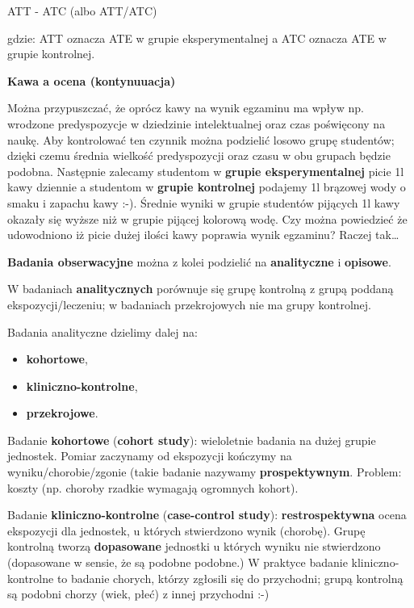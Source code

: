 \documentclass[
  openany]{book}
\begin{document}
ATT - ATC (albo ATT/ATC)

gdzie: ATT oznacza ATE w grupie eksperymentalnej
a ATC oznacza ATE w grupie kontrolnej.

\begin{example}
\textbf{Kawa a ocena (kontynuuacja)}

Można przypuszczać, że oprócz kawy na wynik egzaminu ma wpływ np. wrodzone predyspozycje
w dziedzinie intelektualnej oraz czas poświęcony na naukę.
Aby kontrolować ten czynnik można podzielić losowo grupę studentów;
dzięki czemu średnia wielkość predyspozycji oraz czasu w obu grupach będzie podobna.
Następnie zalecamy studentom w \textbf{grupie eksperymentalnej} picie 1l kawy dziennie
a studentom w \textbf{grupie kontrolnej} podajemy 1l brązowej wody o smaku i zapachu kawy :-).
Średnie wyniki w
grupie studentów pijących 1l kawy okazały się wyższe niż w grupie pijącej kolorową wodę.
Czy można powiedzieć że udowodniono
iż picie dużej ilości kawy poprawia wynik egzaminu?
Raczej tak\ldots{}
\end{example}

\textbf{Badania obserwacyjne} można z kolei podzielić na \textbf{analityczne} i \textbf{opisowe}.

W badaniach \textbf{analitycznych} porównuje się grupę kontrolną z grupą poddaną ekspozycji/leczeniu;
w badaniach przekrojowych nie ma grupy kontrolnej.

Badania analityczne dzielimy dalej na:

\begin{itemize}
\item
  \textbf{kohortowe},
\item
  \textbf{kliniczno-kontrolne},
\item
  \textbf{przekrojowe}.
\end{itemize}

Badanie \textbf{kohortowe} (\textbf{cohort study}): wieloletnie badania na dużej grupie jednostek.
Pomiar zaczynamy od ekspozycji kończymy na wyniku/chorobie/zgonie
(takie badanie nazywamy \textbf{prospektywnym}.
Problem: koszty (np. choroby rzadkie wymagają ogromnych kohort).

Badanie \textbf{kliniczno-kontrolne} (\textbf{case-control study}): \textbf{restrospektywna} ocena ekspozycji
dla jednostek, u których stwierdzono wynik (chorobę). Grupę kontrolną tworzą \textbf{dopasowane} jednostki
u których wyniku nie stwierdzono (dopasowane w sensie, że są podobne podobne.)
W praktyce badanie kliniczno-kontrolne to badanie chorych, którzy zgłosili się do przychodni;
grupą kontrolną są podobni chorzy (wiek, płeć) z innej przychodni :-)
\end{document}
